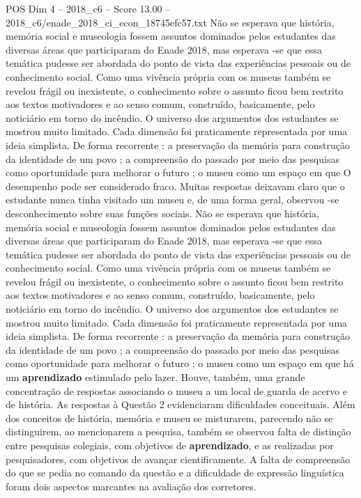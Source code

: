 \begin{textsample}{POS Dim 4 – 2018\_c6 – Score 13.00 – 2018\_c6/enade\_2018\_ci\_econ\_18745efc57.txt}
Não se esperava que história, memória social e museologia fossem assuntos dominados pelos estudantes das diversas áreas que participaram do Enade 2018, mas esperava -se que essa temática pudesse ser abordada do ponto de vista das experiências pessoais ou de conhecimento social.
Como uma vivência própria com os museus também se revelou frágil ou inexistente, o conhecimento sobre o assunto ficou bem restrito aos textos motivadores e ao senso comum, construído, basicamente, pelo noticiário em torno do incêndio.
O universo dos argumentos dos estudantes se mostrou muito limitado.
Cada dimensão foi praticamente representada por uma ideia simplista.
De forma recorrente : a preservação da memória para construção da identidade de um povo ; a compreensão do passado por meio das pesquisas como oportunidade para melhorar o futuro ; o museu como um espaço em que O desempenho pode ser considerado fraco.
Muitas respostas deixavam claro que o estudante nunca tinha visitado um museu e, de uma forma geral, observou -se desconhecimento sobre suas funções sociais.
Não se esperava que história, memória social e museologia fossem assuntos dominados pelos estudantes das diversas áreas que participaram do Enade 2018, mas esperava -se que essa temática pudesse ser abordada do ponto de vista das experiências pessoais ou de conhecimento social.
Como uma vivência própria com os museus também se revelou frágil ou inexistente, o conhecimento sobre o assunto ficou bem restrito aos textos motivadores e ao senso comum, construído, basicamente, pelo noticiário em torno do incêndio.
O universo dos argumentos dos estudantes se mostrou muito limitado.
Cada dimensão foi praticamente representada por uma ideia simplista.
De forma recorrente : a preservação da memória para construção da identidade de um povo ; a compreensão do passado por meio das pesquisas como oportunidade para melhorar o futuro ; o museu como um espaço em que há um \textbf{aprendizado} estimulado pelo lazer.
Houve, também, uma grande concentração de respostas associando o museu a um local de guarda de acervo e de história.
As respostas à Questão 2 evidenciaram dificuldades conceituais.
Além dos conceitos de história, memória e museu se misturarem, parecendo não se distinguirem, ao mencionarem a pesquisa, também se observou falta de distinção entre pesquisas colegiais, com objetivos de \textbf{aprendizado}, e as realizadas por pesquisadores, com objetivos de avançar cientificamente.
A falta de compreensão do que se pedia no comando da questão e a dificuldade de expressão linguística foram dois aspectos marcantes na avaliação dos corretores.

\end{textsample}
